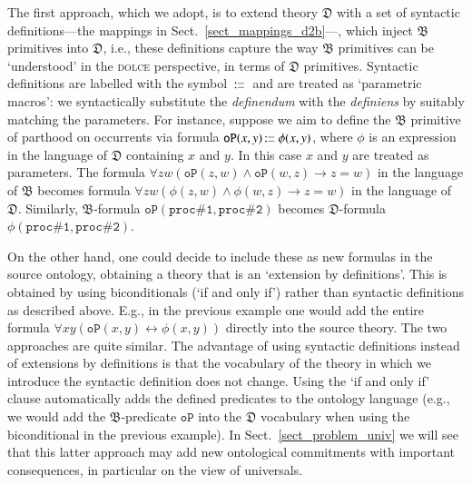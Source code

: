 \documentclass[ao]{iosart2x}
\newcommand{\pr}[1]{\mathtt{#1}}
\newcommand{\cn}[1]{\mathtt{#1}}
\newcommand{\ifif}{\leftrightarrow}
\newcommand\textequal{%
 \rule[.08ex]{5pt}{0.35pt}\llap{\rule[.78ex]{5pt}{0.35pt}}}
\newcommand{\sdef}{{\hspace{1.5pt}:\hspace{-2.5pt}\textequal\hspace{3pt}}}
\newcommand{\dolce}{{\textsc{dolce}}}
\newcommand {\thdolce} {\ensuremath{\mathfrak{D}}}
\newcommand {\thbfo} {\ensuremath{\mathfrak{B}}}
\newcommand{\bfoopart}{\pr{oP}}
\begin{document}
The first approach, which we adopt, is to extend theory $\thdolce$ with a set of syntactic definitions---the mappings in Sect.~\ref{sect_mappings_d2b}---, which inject {$\thbfo$} primitives into {$\thdolce$}, i.e., these definitions capture the way {$\thbfo$} primitives can be `understood' in the {\dolce} perspective, in terms of {$\thdolce$} primitives. 
Syntactic definitions are labelled with the symbol {$\sdef$} and are treated as `parametric macros': we syntactically substitute the \emph{definendum} with the \emph{definiens} by suitably matching the parameters. For instance, suppose we aim to define the {$\thbfo$} primitive of parthood on occurrents via formula $\bfoopart(x,y) \sdef \phi(x,y)$, where $\phi$ is an expression in the language of {$\thdolce$} containing $x$ and $y$. In this case $x$ and $y$ are treated as parameters. The formula $\forall zw(\bfoopart(z,w) \land \bfoopart(w,z) \to z=w)$ in the language of {$\thbfo$} becomes formula $\forall zw(\phi(z,w) \land \phi(w,z) \to z=w)$ in the language of {$\thdolce$}. Similarly, {$\thbfo$}-formula $\bfoopart(\cn{proc\#1},\cn{proc\#2})$ becomes {$\thdolce$}-formula $\phi(\cn{proc\#1},\cn{proc\#2})$. 

On the other hand, one could decide to include these as new formulas in the source ontology, obtaining a theory that is an `extension by definitions'. This is obtained by using biconditionals (`if and only if') rather than syntactic definitions as described above. E.g., in the previous example one would add the entire formula $\forall xy(\bfoopart(x,y) \ifif \phi(x,y))$ directly into the source theory. The two approaches are quite similar. The advantage of using syntactic definitions instead of extensions by definitions is that the vocabulary of the theory in which we introduce the syntactic definition does not change. Using the `if and only if' clause automatically adds the defined predicates to the ontology language (e.g., we would add the {$\thbfo$}-predicate $\bfoopart$ into the {$\thdolce$} vocabulary when using the biconditional in the previous example). In Sect.~\ref{sect_problem_univ} we will see that this latter approach may add new ontological commitments with important consequences, in particular on the view of universals.
\end{document}
